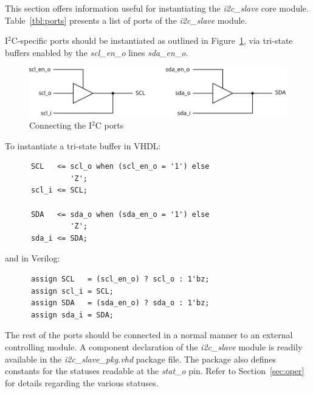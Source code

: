 \documentclass[a4paper,11pt]{article}
\begin{document}
This section offers information useful for instantiating the \textit{i2c\_slave} core module. 
Table~\ref{tbl:ports} presents a list of ports of the \textit{i2c\_slave} module. 

I$^2$C-specific ports should be instantiated as outlined in Figure~\ref{fig:i2c-ports}, via 
tri-state buffers enabled by the \textit{scl\_en\_o} lines \textit{sda\_en\_o}.

\begin{figure}[h]
  \centerline{\includegraphics[width=.75\textwidth]{fig/i2c-ports}}
  \caption{Connecting the I$^2$C ports}
  \label{fig:i2c-ports}
\end{figure}

To instantiate a tri-state buffer in VHDL:

\footnotesize
\begin{verbatim}
      SCL   <= scl_o when (scl_en_o = '1') else
               'Z';
      scl_i <= SCL;

      SDA   <= sda_o when (sda_en_o = '1') else
               'Z';
      sda_i <= SDA;
\end{verbatim}

\normalsize
\noindent and in Verilog:

\footnotesize
\begin{verbatim}
      assign SCL   = (scl_en_o) ? scl_o : 1'bz;
      assign scl_i = SCL;
      assign SDA   = (sda_en_o) ? sda_o : 1'bz;
      assign sda_i = SDA;
\end{verbatim}

\normalsize

The rest of the ports should be connected in a normal manner to an external controlling module. A
component declaration of the \textit{i2c\_slave} module is readily available in the 
\textit{i2c\_slave\_pkg.vhd} package file. The package also defines constants for the 
statuses readable at the \textit{stat\_o} pin. Refer to Section~\ref{sec:oper} for details 
regarding the various statuses.
\end{document}
